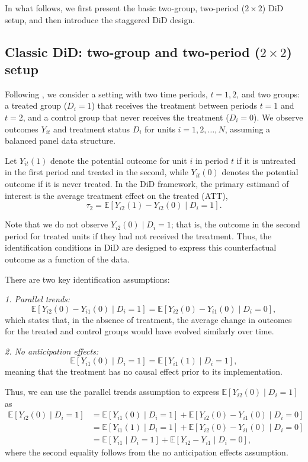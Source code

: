 In what follows, we first present the basic two-group, two-period ($2\times2$) DiD setup, and then introduce the staggered DiD design.

\subsection{Classic DiD: two-group and two-period ($2\times2$) setup}\label{sec12_51}

Following \cite{roth2023whats}, we consider a setting with two time periods, \( t = 1, 2 \), and two groups: a treated group (\( D_i = 1 \)) that receives the treatment between periods \( t = 1 \) and \( t = 2 \), and a control group that never receives the treatment (\( D_i = 0 \)). We observe outcomes \( Y_{it} \) and treatment status \( D_i \) for units \( i = 1, 2, \dots, N \), assuming a balanced panel data structure.

Let \( Y_{it}(1) \) denote the potential outcome for unit \( i \) in period \( t \) if it is untreated in the first period and treated in the second, while \( Y_{it}(0) \) denotes the potential outcome if it is never treated. In the DiD framework, the primary estimand of interest is the average treatment effect on the treated (ATT),
\[
\tau_{2} = \mathbb{E}[Y_{i2}(1) - Y_{i2}(0) \mid D_i = 1].
\]

Note that we do not observe \( Y_{i2}(0) \mid D_i = 1 \); that is, the outcome in the second period for treated units if they had not received the treatment. Thus, the identification conditions in DiD are designed to express this counterfactual outcome as a function of the data.

There are two key identification assumptions:

\textit{1. Parallel trends:}
\begin{equation*}
	\mathbb{E}[Y_{i2}(0) - Y_{i1}(0) \mid D_i = 1] = \mathbb{E}[Y_{i2}(0) - Y_{i1}(0) \mid D_i = 0],
\end{equation*}
which states that, in the absence of treatment, the average change in outcomes for the treated and control groups would have evolved similarly over time.

\textit{2. No anticipation effects:}
\begin{equation*}
	\mathbb{E}[Y_{i1}(0)\mid D_i=1] = \mathbb{E}[Y_{i1}(1)\mid D_i=1],
\end{equation*}
meaning that the treatment has no causal effect prior to its implementation.

Thus, we can use the parallel trends assumption to express \( \mathbb{E}[Y_{i2}(0) \mid D_i = 1] \) as
\begin{align*}
	\mathbb{E}[Y_{i2}(0)\mid D_i = 1] 
	&= \mathbb{E}[Y_{i1}(0) \mid D_i = 1] + \mathbb{E}[Y_{i2}(0) - Y_{i1}(0) \mid D_i = 0] \\
	&= \mathbb{E}[Y_{i1}(1) \mid D_i = 1] + \mathbb{E}[Y_{i2}(0) - Y_{i1}(0) \mid D_i = 0] \\
	&= \mathbb{E}[Y_{i1} \mid D_i = 1] + \mathbb{E}[Y_{i2} - Y_{i1} \mid D_i = 0],
\end{align*}
where the second equality follows from the no anticipation effects assumption.

